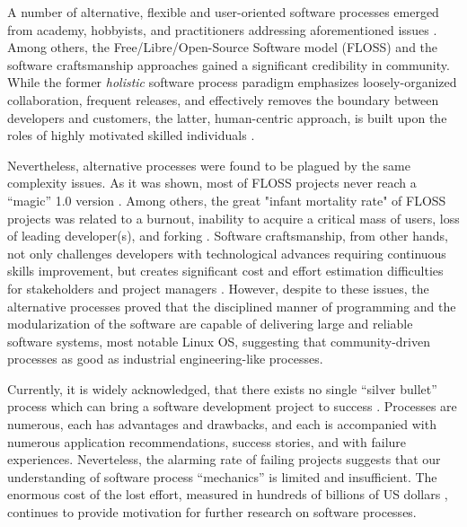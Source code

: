 A number of alternative, flexible and user-oriented software processes emerged from 
academy, hobbyists, and practitioners addressing aforementioned issues \cite{citeulike:3729379}. 
Among others, the Free/Libre/Open-Source Software model (FLOSS) and the software craftsmanship  
approaches gained a significant credibility in community. 
While the former \textit{holistic} software process paradigm emphasizes loosely-organized 
collaboration, frequent releases, and effectively removes the boundary between developers 
and customers, the latter, human-centric approach, is built upon the roles of highly 
motivated skilled individuals \cite{citeulike:262020} \cite{citeulike:2759198}. 

Nevertheless, alternative processes were found to be plagued by the same complexity issues. 
As it was shown, most of FLOSS projects never reach a ``magic'' 1.0 version \cite{citeulike:12480029}. 
Among others, the great "infant mortality rate" of FLOSS projects was related to a burnout, 
inability to acquire a critical mass of users, loss of leading developer(s), and forking \cite{richter2007critique}. 
Software craftsmanship, from other hands, not only challenges developers with technological advances 
requiring continuous skills improvement, but creates significant cost and effort estimation difficulties for
stakeholders and project managers \cite{citeulike:11058784}. However, despite to these issues, 
the alternative processes proved that the disciplined manner of programming and the modularization  
of the software are capable of delivering large and reliable software systems, most notable Linux OS,
suggesting that community-driven processes as good as industrial engineering-like processes.

Currently, it is widely acknowledged, that there exists no single ``silver bullet'' process which 
can bring a software development project to success \cite{citeulike:1986013}. 
Processes are numerous, each has advantages and drawbacks, and each is accompanied with 
numerous application recommendations, success stories, and with failure experiences. Neverteless,
the alarming rate of failing projects suggests that our understanding of software process ``mechanics''  
is limited and insufficient\cite{citeulike:12550665}. 
The enormous cost of the lost effort, measured in hundreds of billions of US dollars 
\cite{citeulike:2207657} \cite{citeulike:2207653} \cite{citeulike:2207655}, 
continues to provide motivation for further research on software processes. 

%
%
